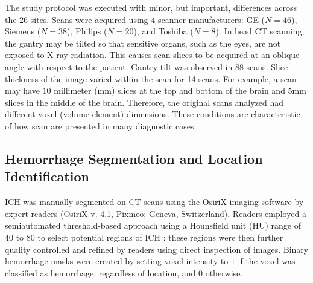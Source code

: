 \documentclass{elsarticle_nonatbib}\usepackage[]{graphicx}\usepackage[]{color}
\begin{document}
The study protocol was executed with minor, but important, differences across the $26$ sites.  Scans were acquired using $4$ scanner manufacturers: GE ($N=46$),  Siemens ($N=38$),  Philips ($N=20$),  and Toshiba ($N=8$).   In head CT scanning, the gantry may be tilted so that sensitive organs, such as the eyes, are not exposed to X-ray radiation.  This causes scan slices to be acquired at an oblique angle with respect to the patient.  Gantry tilt was observed in $88$ scans.
Slice thickness of the image varied within the scan for 14 scans.
For example, a scan may have $10$ millimeter (mm) slices at the top and bottom of the brain and $5$mm slices in the middle of the brain.  Therefore, the original scans analyzed had different voxel (volume element) dimensions.  These conditions are characteristic of how scan are presented in many diagnostic cases.



\subsection{Hemorrhage Segmentation and Location Identification}
ICH was manually segmented on CT scans using the OsiriX imaging software by expert readers (OsiriX v. 4.1, Pixmeo; Geneva, Switzerland).  Readers employed a semiautomated threshold-based approach using a Hounsfield unit (HU) range of $40$ to $80$ to select potential regions of ICH \citep{bergstrom_variation_1977, smith_imaging_2006}; these regions were then further quality controlled and refined by readers using direct inspection of images.  Binary hemorrhage masks were created by setting voxel intensity to $1$ if the voxel was classified as hemorrhage, regardless of location, and $0$ otherwise.  
\end{document}
